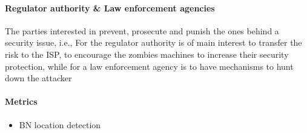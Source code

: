 \paragraph{Regulator authority \& Law enforcement agencies}
The parties interested in prevent, prosecute and punish the ones behind a security issue, i.e., For the regulator authority is of main interest to transfer the risk to the ISP, to encourage the zombies machines to increase their security protection, while for a law enforcement agency is to have mechanisms to hunt down the attacker
\paragraph{Metrics}
\begin{itemize}
    \item BN location detection
\end{itemize}



